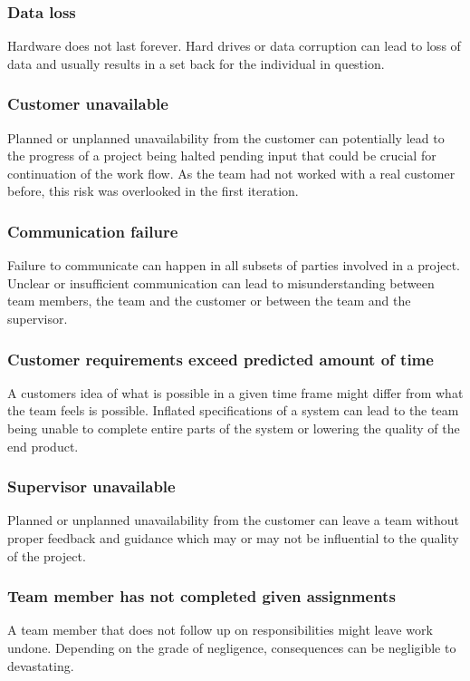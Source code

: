 \subsubsection{Data loss}
Hardware does not last forever. Hard drives or data corruption can lead to loss of data and usually results in a set back for the individual in question.

\subsubsection{Customer unavailable}
Planned or unplanned unavailability from the customer can potentially lead to the progress of a project being halted pending input that could be crucial for continuation of the work flow.
As the team had not worked with a real customer before, this risk was overlooked in the first iteration.


\subsubsection{Communication failure}
Failure to communicate can happen in all subsets of parties involved in a project. Unclear or insufficient communication can lead to misunderstanding between team members, the team and the customer or between the team and the supervisor.

\subsubsection{Customer requirements exceed predicted amount of time}
A customers idea of what is possible in a given time frame might differ from what the team feels is possible. Inflated specifications of a system can lead to the team being unable to complete entire parts of the system or lowering the quality of the end product.

\subsubsection{Supervisor unavailable}
Planned or unplanned unavailability from the customer can leave a team without proper feedback and guidance which may or may not be influential to the quality of the project.

\subsubsection{Team member has not completed given assignments}
A team member that does not follow up on responsibilities might leave work undone. Depending on the grade of negligence, consequences can be negligible to devastating.

